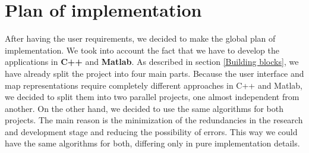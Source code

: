 \section{Plan of implementation}
After having the user requirements, we decided to make the global plan of implementation. We took into account the fact that we have to develop the applications in \textbf{C++} and \textbf{Matlab}. As described in section \ref{Building blocks}, we have already split the project into four main parts. Because the user interface and map representations require completely different approaches in C++ and Matlab, we decided to split them into two parallel projects, one almost independent from another. On the other hand, we decided to use the same algorithms for both projects. The main reason is the minimization of the redundancies in the research and development stage and reducing the possibility of errors. This way we could have the same algorithms for both, differing only in pure implementation details.


